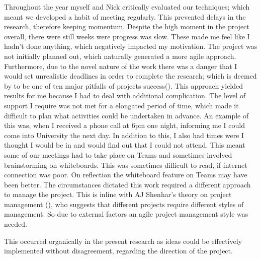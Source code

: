 Throughout the year myself and Nick critically evaluated our techniques; which meant we developed a habit of meeting regularly. This prevented delays in the research, therefore keeping momentum. Despite the high moment in the project overall, there were still weeks were progress was slow. These made me feel like I hadn't done anything, which negatively impacted my motivation. The project was not initially planned out, which naturally generated a more agile approach. Furthermore, due to the novel nature of the work there was a danger that I would set unrealistic deadlines in order to complete the research; which is deemed by \citeauthor{GanttPRO} to be one of ten major pitfalls of projects success(\cite{GanttPRO}). This approach yielded results for me because I had to deal with additional complication. The level of support I require was not met for a elongated period of time, which made it difficult to plan what activities could be undertaken in advance. An example of this was, when I received a phone call at 6pm one night, informing me I could come into University the next day. In addition to this, I also had times were I thought I would be in and would find out that I could not attend. This meant some of our meetings had to take place on Teams and sometimes involved brainstorming on whiteboards. This was sometimes difficult to read, if internet connection was poor. On reflection the whiteboard feature on Teams may have been better. The circumstances dictated this work required a different approach to manage the project. This is inline with AJ Shenhar's theory on project management (\cite{Shenhar1}), who suggests that different projects require different styles of management. So due to external factors an agile project management style was needed.

This occurred organically in the present research as ideas could be effectively implemented without disagreement, regarding the direction of the project. %

